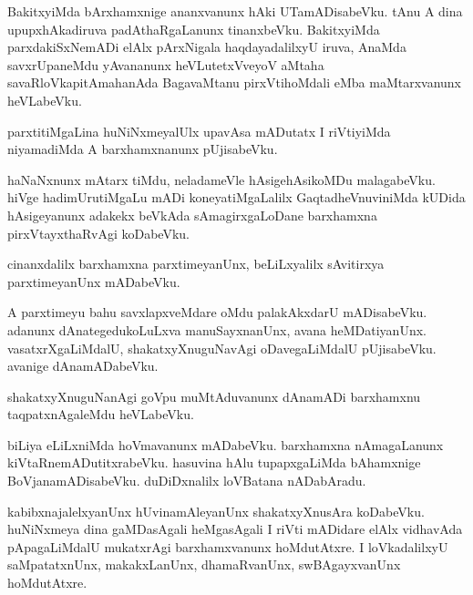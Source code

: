 \documentclass{article}
\begin{document}
\begin{mn}%
BakitxyiMda bArxhamxnige ananxvanunx hAki UTamADisabeVku. tAnu A dina
upupxhAkadiruva padAthaRgaLanunx tinanxbeVku. BakitxyiMda
parxdakiSxNemADi elAlx pArxNigala haqdayadalilxyU iruva, AnaMda
savxrUpaneMdu yAvananunx heVLutetxVveyoV aMtaha savaRloVkapitAmahanAda
BagavaMtanu pirxVtihoMdali eMba maMtarxvanunx heVLabeVku.
\end{mn}

\begin{mn}
parxtitiMgaLina huNiNxmeyalUlx upavAsa mADutatx I riVtiyiMda
niyamadiMda A barxhamxnanunx pUjisabeVku.
\end{mn}

\begin{mn}%
haNaNxnunx mAtarx tiMdu, neladameVle hAsigehAsikoMDu
malagabeVku. hiVge hadimUrutiMgaLu mADi koneyatiMgaLalilx
GaqtadheVnuviniMda kUDida hAsigeyanunx adakekx beVkAda
sAmagirxgaLoDane barxhamxna pirxVtayxthaRvAgi koDabeVku.
\end{mn}

\begin{mn}%
cinanxdalilx barxhamxna parxtimeyanUnx, beLiLxyalilx sAvitirxya
parxtimeyanUnx mADabeVku.
\end{mn}

\begin{mn}%
A parxtimeyu bahu savxlapxveMdare oMdu palakAkxdarU
mADisabeVku. adanunx dAnategedukoLuLxva manuSayxnanUnx, avana
heMDatiyanUnx. vasatxrXgaLiMdalU, shakatxyXnuguNavAgi oDavegaLiMdalU
pUjisabeVku. avanige dAnamADabeVku.
\end{mn}

\begin{mn}
shakatxyXnuguNanAgi goVpu muMtAduvanunx dAnamADi barxhamxnu
taqpatxnAgaleMdu heVLabeVku.
\end{mn}

\begin{mn}
biLiya eLiLxniMda hoVmavanunx mADabeVku. barxhamxna nAmagaLanunx
kiVtaRnemADutitxrabeVku. hasuvina hAlu tupapxgaLiMda bAhamxnige
BoVjanamADisabeVku. duDiDxnalilx loVBatana nADabAradu.
\end{mn}

\begin{mn}%
kabibxnajalelxyanUnx hUvinamAleyanUnx shakatxyXnusAra
koDabeVku. huNiNxmeya dina gaMDasAgali heMgasAgali I riVti mADidare
elAlx vidhavAda pApagaLiMdalU mukatxrAgi barxhamxvanunx hoMdutAtxre. I
loVkadalilxyU saMpatatxnUnx, makakxLanUnx, dhamaRvanUnx,
swBAgayxvanUnx hoMdutAtxre.
\end{mn}
\end{document}
